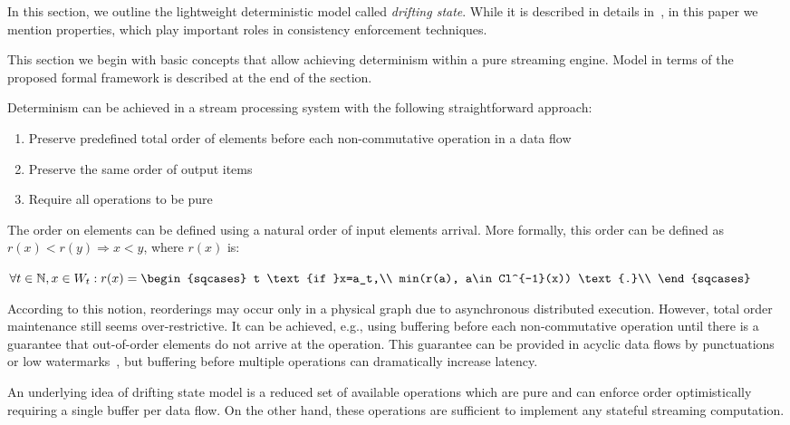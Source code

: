 
\label {fs-model-section}

In this section, we outline the lightweight deterministic model called {\em drifting state}. While it is described in details in~\cite{we2018adbis}, in this paper we mention properties, which play important roles in consistency enforcement techniques.

This section we begin with basic concepts that allow achieving determinism within a pure streaming engine. Model in terms of the proposed formal framework is described at the end of the section.

Determinism can be achieved in a stream processing system with the following straightforward approach:
\begin{enumerate}
    \item Preserve predefined total order of elements before each non-commutative operation in a data flow
    \item Preserve the same order of output items
    \item Require all operations to be pure
\end{enumerate}

The order on elements can be defined using a natural order of input elements arrival. More formally, this order can be defined as $r(x) < r(y) \Rightarrow x < y$, where $r(x)$ is:

$\forall{t\in{\mathbb{N}}, x\in{W_t}} : r(x)=\begin{sqcases}
t \text{if }x=a_t,\\
min(r(a), a\in Cl^{-1}(x)) \text{.}\\
\end{sqcases}$

According to this notion, reorderings may occur only in a physical graph due to asynchronous distributed execution. However, total order maintenance still seems over-restrictive. It can be achieved, e.g., using buffering before each non-commutative operation until there is a guarantee that out-of-order elements do not arrive at the operation. This guarantee can be provided in acyclic data flows by punctuations or low watermarks~\cite{Li:2008:OPN:1453856.1453890}, but buffering before multiple operations can dramatically increase latency.

An underlying idea of drifting state model is a reduced set of available operations which are pure and can enforce order optimistically requiring a single buffer per data flow. On the other hand, these operations are sufficient to implement any stateful streaming computation.

